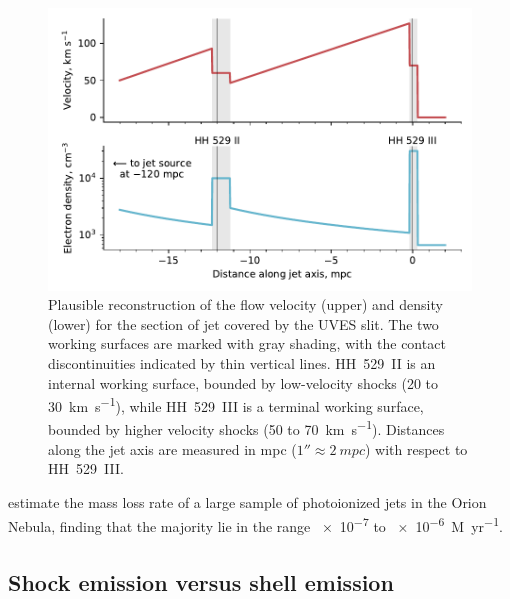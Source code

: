 \documentclass[useAMS, usenatbib]{mnras}
\begin{document}
\begin{figure}
  \centering
  \includegraphics[width=\linewidth]{hh529-ii-iii-ws-profiles}
  \caption{
    Plausible reconstruction of the flow velocity (upper)
    and density (lower)
    for the section of jet covered by the UVES slit.
    The two working surfaces are marked with gray shading,
    with the contact discontinuities indicated by thin vertical lines.
    HH~529~II is an internal working surface, bounded by low-velocity shocks (\num{20} to \SI{30}{km.s^{-1}}),
    while HH~529~III is a terminal working surface, bounded by higher velocity shocks (\num{50} to \SI{70}{km.s^{-1}}).
    Distances along the jet axis are measured in mpc (\(1'' \approx \SI{2}{mpc}\))
    with respect to HH~529~III.
  }
  \label{fig:ws-profiles}
\end{figure}


\citet{Bally:2006a} estimate the mass loss rate of a large sample of photoionized jets in the Orion Nebula, finding that the majority lie in the range \num{e-7} to \SI{e-6}{M_\odot.yr^{-1}}.  



\subsection{Shock emission versus shell emission}
\label{sec:shock-emiss-vers}




\end{document}
